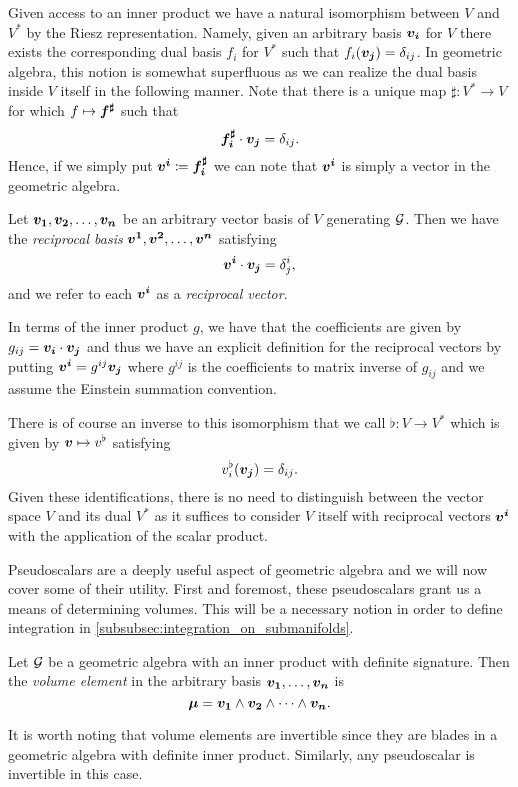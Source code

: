 Given access to an inner product we have a natural isomorphism between $V$ and $V^*$ by the Riesz representation.  Namely, given an arbitrary basis $\boldsymbol{v_i}$ for $V$ there exists the corresponding dual basis $f_i$ for $V^*$ such that $f_i(\boldsymbol{v_j})=\delta_{ij}$. In geometric algebra, this notion is somewhat superfluous as we can realize the dual basis inside $V$ itself in the following manner. Note that there is a unique map $\sharp \colon V^* \to V$ for which $f\mapsto \boldsymbol{f^\sharp}$ such that
\begin{equation}
\boldsymbol{f_i^\sharp} \cdot \boldsymbol{v_j} = \delta_{ij}.
\end{equation}
Hence, if we simply put $\boldsymbol{v^i} \coloneqq \boldsymbol{f_i^\sharp}$ we can note that $\boldsymbol{v^i}$ is simply a vector in the geometric algebra.
\begin{definition}
Let $\boldsymbol{v_1},\boldsymbol{v_2},\dots,\boldsymbol{v_n}$ be an arbitrary vector basis of $V$ generating $\mathcal{G}$. Then we have the \emph{reciprocal basis} $\boldsymbol{v^1},\boldsymbol{v^2},\dots,\boldsymbol{v^n}$ satisfying
\begin{equation}
    \boldsymbol{v^i}\cdot \boldsymbol{v_j} = \delta^i_j,
\end{equation}
and we refer to each $\boldsymbol{v^i}$ as a \emph{reciprocal vector}.
\end{definition}
In terms of the inner product $g$, we have that the coefficients are given by $g_{ij}=\boldsymbol{v_i}\cdot \boldsymbol{v_j}$ and thus we have an explicit definition for the reciprocal vectors by putting $\boldsymbol{v^i} = g^{ij}\boldsymbol{v_j}$ where $g^{ij}$ is the coefficients to matrix inverse of $g_{ij}$ and we assume the Einstein summation convention. 

There is of course an inverse to this isomorphism that we call $\flat \colon V \to V^*$ which is given by $\boldsymbol{v} \mapsto v^\flat$ satisfying
\[
v_i^\flat (\boldsymbol{v_j})= \delta_{ij}.
\]
Given these identifications, there is no need to distinguish between the vector space $V$ and its dual $V^*$ as it suffices to consider $V$ itself with reciprocal vectors $\boldsymbol{v^i}$ with the application of the scalar product.

Pseudoscalars are a deeply useful aspect of geometric algebra and we will now cover some of their utility. First and foremost, these pseudoscalars grant us a means of determining volumes. This will be a necessary notion in order to define integration in \cref{subsubsec:integration_on_submanifolds}.
\begin{definition}
Let $\mathcal{G}$ be a geometric algebra with an inner product with definite signature. Then the \emph{volume element} in the arbitrary basis $\boldsymbol{v_1},\dots,\boldsymbol{v_n}$ is 
\begin{equation}
\boldsymbol{\mu}=\boldsymbol{v_1} \wedge \boldsymbol{v_2} \wedge \cdots \wedge \boldsymbol{v_n}.
\end{equation}
\end{definition}
It is worth noting that volume elements are invertible since they are blades in a geometric algebra with definite inner product. Similarly, any pseudoscalar is invertible in this case. 

